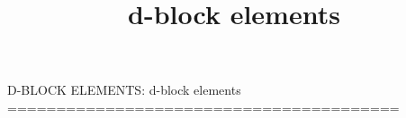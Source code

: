 \documentclass[12pt,a4paper]{article}
\begin{document}
\title{d-block elements}
\maketitle


D-BLOCK ELEMENTS: d-block elements
========================================
\end{document}
